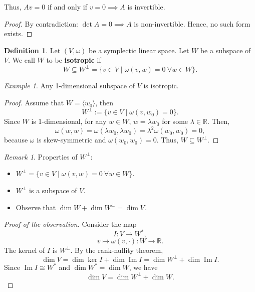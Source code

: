 \documentclass[11pt]{article}
\theoremstyle{definition}
\newtheorem{definition}{Definition}[section]
\theoremstyle{remark}
\newtheorem{remark}{Remark}[section]
\newtheorem{example}{Example}[section]
\begin{document}
Thus, \( Av = 0 \) if and only if \( v = 0 \implies A \) is invertible.

\begin{proof}
By contradiction: \(\det A = 0 \implies A\) is non-invertible.
Hence, no such form exists.
\end{proof}

\begin{definition}\label{def:isotropic}
Let $(V, \omega)$ be a symplectic linear space. Let $W$ be a subspace of $V$. We call $W$ to be \textbf{isotropic} if
\[ W \subseteq W^\perp = \{ v \in V \mid \omega(v, w) = 0 \ \forall w \in W \}. \]
\end{definition}

\begin{example}\label{ex:1d_isotropic}
Any 1-dimensional subspace of $V$ is isotropic.
\end{example}

\begin{proof}
Assume that $W = \langle w_0 \rangle$, then
\[ W^\perp := \{ v \in V \mid \omega(v, w_0) = 0 \}. \]
Since $W$ is 1-dimensional, for any $w \in W$, $w = \lambda w_0$ for some $\lambda \in \mathbb{R}$. Then,
\[ \omega(w, w) = \omega(\lambda w_0, \lambda w_0) = \lambda^2 \omega(w_0, w_0) = 0, \]
because $\omega$ is skew-symmetric and $\omega(w_0, w_0) = 0$. Thus, $W \subseteq W^\perp$.
\end{proof}

\begin{remark}\label{rem:properties_of_W_perp}
Properties of $W^\perp$:
\begin{itemize}
\item $W^\perp = \{ v \in V \mid \omega(v, w) = 0 \ \forall w \in W \}$.
\item $W^\perp$ is a subspace of $V$.
\item Observe that $\dim W + \dim W^\perp = \dim V$.
\end{itemize}
\end{remark}

\begin{proof}[Proof of the observation]
Consider the map
\[ I \colon V \to W^*, \]
\[ v \mapsto \omega(v, \cdot) \colon W \to \mathbb{R}. \]
The kernel of $I$ is $W^\perp$. By the rank-nullity theorem,
\[ \dim V = \dim \ker I + \dim \operatorname{Im} I = \dim W^\perp + \dim \operatorname{Im} I. \]
Since $\operatorname{Im} I \cong W^*$ and $\dim W^* = \dim W$, we have
\[ \dim V = \dim W^\perp + \dim W. \]
\end{proof}
\end{document}
